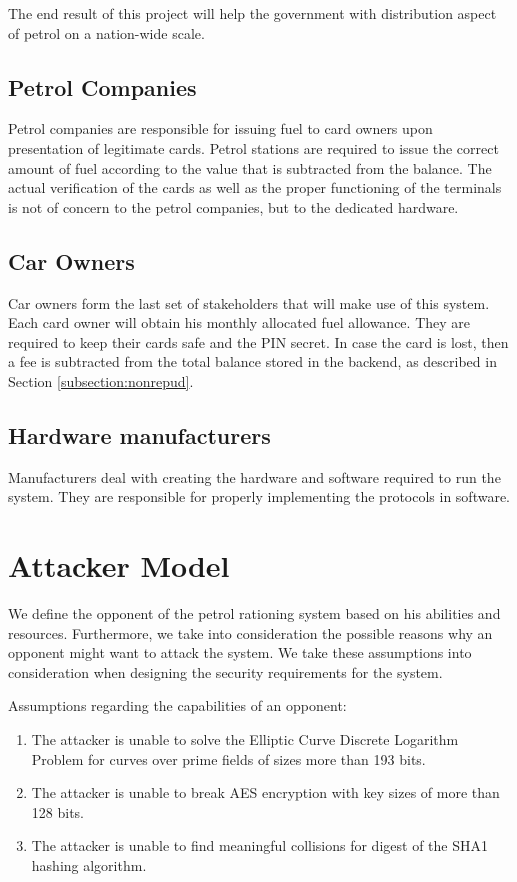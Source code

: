 \documentclass[a4paper,10pt]{llncs}
\begin{document}
The end result of this project will help the government with distribution aspect of petrol on a nation-wide scale.

\subsection{Petrol Companies}

Petrol companies are responsible for issuing fuel to card owners upon presentation of legitimate cards. Petrol stations are required to issue the correct amount of fuel according to the value that is subtracted from the balance. The actual verification of the cards as well as the proper functioning of the terminals is not of concern to the petrol companies, but to the dedicated hardware.

\subsection{Car Owners}

Car owners form the last set of stakeholders that will make use of this system. Each card owner will obtain his monthly allocated fuel allowance. They are required to keep their cards safe and the PIN secret. In case the card is lost, then a fee is subtracted from the total balance stored in the backend, as described in Section \ref{subsection:nonrepud}.

\subsection{Hardware manufacturers}

Manufacturers deal with creating the hardware and software required to run the system. They are responsible for properly implementing the protocols in software.

\section{Attacker Model}
We define the opponent of the petrol rationing system based on his abilities and resources. Furthermore, we take into consideration the possible reasons why an opponent might want to attack the system. We take these assumptions into consideration when designing the security requirements for the system.

Assumptions regarding the capabilities of an opponent:
\begin{enumerate}
	\item The attacker is unable to solve the Elliptic Curve Discrete Logarithm Problem for curves over prime fields of sizes more than 193 bits.
	\item The attacker is unable to break AES encryption with key sizes of more than 128 bits.
	\item The attacker is unable to find meaningful collisions for digest of the SHA1 hashing algorithm.
\end{enumerate}
\end{document}
